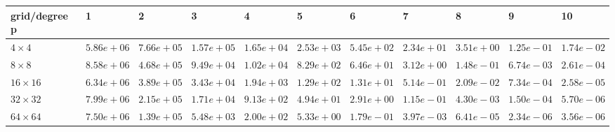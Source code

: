 \begin{tabular}{lllllllllll}
\hline
 grid/degree p   & 1          & 2          & 3          & 4          & 5          & 6          & 7          & 8          & 9          & 10         \\
\hline
 $4 \times 4$    & $5.86e+06$ & $7.66e+05$ & $1.57e+05$ & $1.65e+04$ & $2.53e+03$ & $5.45e+02$ & $2.34e+01$ & $3.51e+00$ & $1.25e-01$ & $1.74e-02$ \\
 $8 \times 8$    & $8.58e+06$ & $4.68e+05$ & $9.49e+04$ & $1.02e+04$ & $8.29e+02$ & $6.46e+01$ & $3.12e+00$ & $1.48e-01$ & $6.74e-03$ & $2.61e-04$ \\
 $16 \times 16$  & $6.34e+06$ & $3.89e+05$ & $3.43e+04$ & $1.94e+03$ & $1.29e+02$ & $1.31e+01$ & $5.14e-01$ & $2.09e-02$ & $7.34e-04$ & $2.58e-05$ \\
 $32 \times 32$  & $7.99e+06$ & $2.15e+05$ & $1.71e+04$ & $9.13e+02$ & $4.94e+01$ & $2.91e+00$ & $1.15e-01$ & $4.30e-03$ & $1.50e-04$ & $5.70e-06$ \\
 $64 \times 64$  & $7.50e+06$ & $1.39e+05$ & $5.48e+03$ & $2.00e+02$ & $5.33e+00$ & $1.79e-01$ & $3.97e-03$ & $6.41e-05$ & $2.34e-06$ & $3.56e-06$ \\
\hline
\end{tabular}